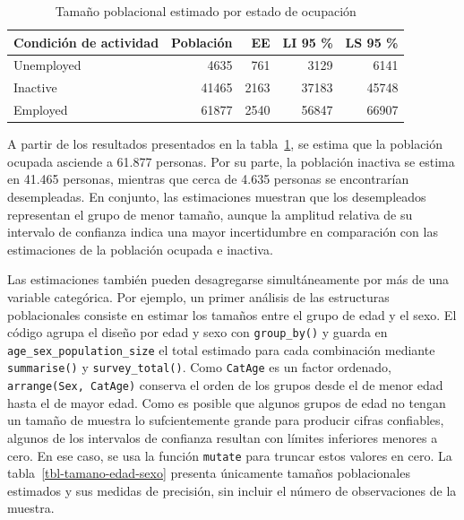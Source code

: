 \documentclass[
  spanish,
  11pt,
  letterpaper,
  oneside,
  open=any]{scrbook}
\begin{document}
{

\begin{longtable}[]{@{}lrrrr@{}}

\caption{\label{tbl-tamano-empleo}Tamaño poblacional estimado por estado
de ocupación}

\tabularnewline

\toprule\noalign{}
Condición de actividad & Población & EE & LI 95 \% & LS 95 \% \\
\midrule\noalign{}
\endhead
\bottomrule\noalign{}
\endlastfoot
Unemployed & 4635 & 761 & 3129 & 6141 \\
Inactive & 41465 & 2163 & 37183 & 45748 \\
Employed & 61877 & 2540 & 56847 & 66907 \\

\end{longtable}

}

A partir de los resultados presentados en la
tabla~\ref{tbl-tamano-empleo}, se estima que la población ocupada
asciende a 61.877 personas. Por su parte, la población inactiva se
estima en 41.465 personas, mientras que cerca de 4.635 personas se
encontrarían desempleadas. En conjunto, las estimaciones muestran que
los desempleados representan el grupo de menor tamaño, aunque la
amplitud relativa de su intervalo de confianza indica una mayor
incertidumbre en comparación con las estimaciones de la población
ocupada e inactiva.

Las estimaciones también pueden desagregarse simultáneamente por más de
una variable categórica. Por ejemplo, un primer análisis de las
estructuras poblacionales consiste en estimar los tamaños entre el grupo
de edad y el sexo. El código agrupa el diseño por edad y sexo con
\texttt{group\_by()} y guarda en \texttt{age\_sex\_population\_size} el
total estimado para cada combinación mediante \texttt{summarise()} y
\texttt{survey\_total()}. Como \texttt{CatAge} es un factor ordenado,
\texttt{arrange(Sex,\ CatAge)} conserva el orden de los grupos desde el
de menor edad hasta el de mayor edad. Como es posible que algunos grupos
de edad no tengan un tamaño de muestra lo sufcientemente grande para
producir cifras confiables, algunos de los intervalos de confianza
resultan con límites inferiores menores a cero. En ese caso, se usa la
función \texttt{mutate} para truncar estos valores en cero. La
tabla~\ref{tbl-tamano-edad-sexo} presenta únicamente tamaños
poblacionales estimados y sus medidas de precisión, sin incluir el
número de observaciones de la muestra.
\end{document}
